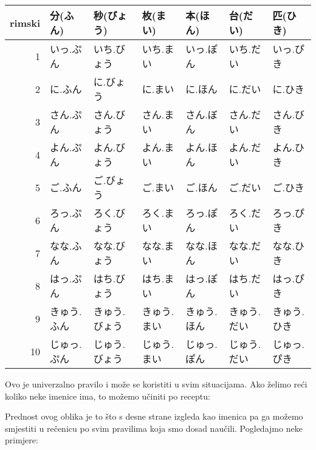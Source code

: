 	\vspace{-20pt}
	\begin{table}[h]
		\centering
		\begin{tabular}{r l l l l l l}\toprule[2pt]
			rimski & 分(ふん) & 秒(びょう) & 枚(まい) & 本(ほん) & 台(だい) & 匹(ひき) \\
			\midrule
			1	& \colorbox{blue!10}{いっ.ぷん} & いち.びょう & いち.まい & \colorbox{blue!10}{いっ.ぽん} & いち.だい & \colorbox{blue!10}{いっ.ぴき} \\
			2	& に.ふん & に.びょう & に.まい & に.ほん & に.だい & に.ひき \\
			3	& \colorbox{blue!10}{さん.ぷん} & さん.びょう & さん.まい & \colorbox{blue!10}{さん.ぼん} & さん.だい & \colorbox{blue!10}{さん.びき} \\
			4	& \colorbox{blue!10}{よん.ぷん} & よん.びょう & よん.まい & よん.ほん & よん.だい & よん.ひき \\
			5	& ご.ふん & ご.びょう & ご.まい & ご.ほん & ご.だい & ご.ひき \\
			6	& \colorbox{blue!10}{ろっ.ぷん} & ろく.びょう & ろく.まい & \colorbox{blue!10}{ろっ.ぽん} & ろく.だい & \colorbox{blue!10}{ろっ.ぴき} \\
			7	& なな.ふん & なな.びょう & なな.まい & なな.ほん & なな.だい & なな.ひき \\
			8	& \colorbox{blue!10}{はっ.ぷん} & はち.びょう & はち.まい & \colorbox{blue!10}{はっ.ぽん} & はち.だい & \colorbox{blue!10}{はっ.ぴき} \\
			9	& きゅう.ふん & きゅう.びょう & きゅう.まい & きゅう.ほん & きゅう.だい & きゅう.ひき \\
			10	& \colorbox{blue!10}{じゅっ.ぷん} & じゅう.びょう & じゅう.まい & \colorbox{blue!10}{じゅっ.ぽん} & じゅう.だい & \colorbox{blue!10}{じゅっ.ぴき} \\
			\bottomrule
		\end{tabular}
	\end{table}
	
	
	Ovo je univerzalno pravilo i može se koristiti u svim situacijama. Ako želimo reći koliko neke imenice ima, to možemo učiniti po receptu:
	
	
	Prednost ovog oblika je to što s desne strane izgleda kao imenica pa ga možemo smjestiti u rečenicu po svim pravilima koja smo dosad naučili. Pogledajmo neke primjere:
	
